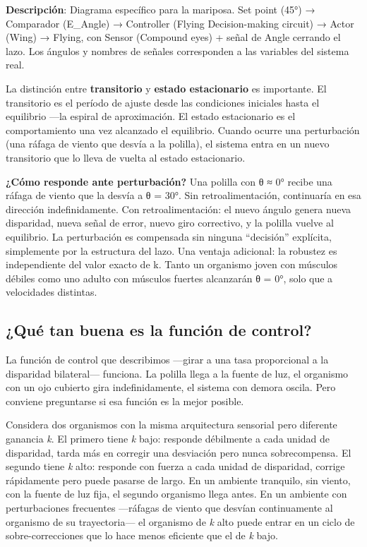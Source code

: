 \documentclass[
  letterpaper,
  DIV=11,
  numbers=noendperiod]{scrreprt}
\begin{document}
\begin{tcolorbox}[enhanced jigsaw, arc=.35mm, bottomrule=.15mm, breakable, colback=white, colframe=quarto-callout-note-color-frame, left=2mm, leftrule=.75mm, opacityback=0, rightrule=.15mm, toprule=.15mm]

\textbf{Descripción}: Diagrama específico para la mariposa. Set point
(45°) → Comparador (E\_Angle) → Controller (Flying Decision-making
circuit) → Actor (Wing) → Flying, con Sensor (Compound eyes) + señal de
Angle cerrando el lazo. Los ángulos y nombres de señales corresponden a
las variables del sistema real.

La distinción entre \textbf{transitorio} y \textbf{estado estacionario}
es importante. El transitorio es el período de ajuste desde las
condiciones iniciales hasta el equilibrio ---la espiral de aproximación.
El estado estacionario es el comportamiento una vez alcanzado el
equilibrio. Cuando ocurre una perturbación (una ráfaga de viento que
desvía a la polilla), el sistema entra en un nuevo transitorio que lo
lleva de vuelta al estado estacionario.

\textbf{¿Cómo responde ante perturbación?} Una polilla con θ ≈ 0° recibe
una ráfaga de viento que la desvía a θ = 30°. Sin retroalimentación,
continuaría en esa dirección indefinidamente. Con retroalimentación: el
nuevo ángulo genera nueva disparidad, nueva señal de error, nuevo giro
correctivo, y la polilla vuelve al equilibrio. La perturbación es
compensada sin ninguna ``decisión'' explícita, simplemente por la
estructura del lazo. Una ventaja adicional: la robustez es independiente
del valor exacto de k. Tanto un organismo joven con músculos débiles
como uno adulto con músculos fuertes alcanzarán θ = 0°, solo que a
velocidades distintas.

\subsection{¿Qué tan buena es la función de
control?}\label{quuxe9-tan-buena-es-la-funciuxf3n-de-control}

La función de control que describimos ---girar a una tasa proporcional a
la disparidad bilateral--- funciona. La polilla llega a la fuente de
luz, el organismo con un ojo cubierto gira indefinidamente, el sistema
con demora oscila. Pero conviene preguntarse si esa función es la mejor
posible.

Considera dos organismos con la misma arquitectura sensorial pero
diferente ganancia \emph{k}. El primero tiene \emph{k} bajo: responde
débilmente a cada unidad de disparidad, tarda más en corregir una
desviación pero nunca sobrecompensa. El segundo tiene \emph{k} alto:
responde con fuerza a cada unidad de disparidad, corrige rápidamente
pero puede pasarse de largo. En un ambiente tranquilo, sin viento, con
la fuente de luz fija, el segundo organismo llega antes. En un ambiente
con perturbaciones frecuentes ---ráfagas de viento que desvían
continuamente al organismo de su trayectoria--- el organismo de \emph{k}
alto puede entrar en un ciclo de sobre-correcciones que lo hace menos
eficiente que el de \emph{k} bajo.


\end{tcolorbox}
\end{document}
